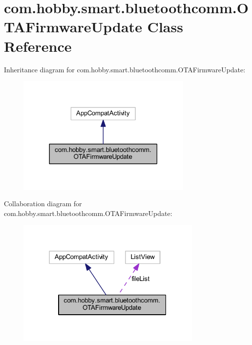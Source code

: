 \hypertarget{classcom_1_1hobby_1_1smart_1_1bluetoothcomm_1_1_o_t_a_firmware_update}{}\section{com.\+hobby.\+smart.\+bluetoothcomm.\+O\+T\+A\+Firmware\+Update Class Reference}
\label{classcom_1_1hobby_1_1smart_1_1bluetoothcomm_1_1_o_t_a_firmware_update}


Inheritance diagram for com.\+hobby.\+smart.\+bluetoothcomm.\+O\+T\+A\+Firmware\+Update\+:\nopagebreak
\begin{figure}[H]
\begin{center}
\leavevmode
\includegraphics[width=245pt]{classcom_1_1hobby_1_1smart_1_1bluetoothcomm_1_1_o_t_a_firmware_update__inherit__graph}
\end{center}
\end{figure}


Collaboration diagram for com.\+hobby.\+smart.\+bluetoothcomm.\+O\+T\+A\+Firmware\+Update\+:\nopagebreak
\begin{figure}[H]
\begin{center}
\leavevmode
\includegraphics[width=259pt]{classcom_1_1hobby_1_1smart_1_1bluetoothcomm_1_1_o_t_a_firmware_update__coll__graph}
\end{center}
\end{figure}
